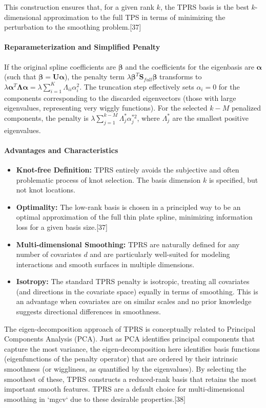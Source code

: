 \documentclass[11pt, a4paper]{article}
\begin{document}
This construction ensures that, for a given rank $k$, the TPRS basis is the best $k$-dimensional approximation to the full TPS in terms of minimizing the perturbation to the smoothing problem.[37]

\paragraph{Reparameterization and Simplified Penalty}
If the original spline coefficients are $\boldsymbol{\beta}$ and the coefficients for the eigenbasis are $\boldsymbol{\alpha}$ (such that $\boldsymbol{\beta} = \mathbf{U}\boldsymbol{\alpha}$), the penalty term $\lambda \boldsymbol{\beta}^T \mathbf{S}_{full} \boldsymbol{\beta}$ transforms to $\lambda \boldsymbol{\alpha}^T \mathbf{\Lambda} \boldsymbol{\alpha} = \lambda \sum_{i=1}^{K} \Lambda_{ii} \alpha_i^2$. The truncation step effectively sets $\alpha_i = 0$ for the components corresponding to the discarded eigenvectors (those with large eigenvalues, representing very wiggly functions). For the selected $k-M$ penalized components, the penalty is $\lambda \sum_{j=1}^{k-M} \Lambda_{j}^* \alpha_j^{*2}$, where $\Lambda_j^*$ are the smallest positive eigenvalues.

\paragraph{Advantages and Characteristics}
\begin{itemize}
 \item \textbf{Knot-free Definition:} TPRS entirely avoids the subjective and often problematic process of knot selection. The basis dimension $k$ is specified, but not knot locations.
 \item \textbf{Optimality:} The low-rank basis is chosen in a principled way to be an optimal approximation of the full thin plate spline, minimizing information loss for a given basis size.[37]
 \item \textbf{Multi-dimensional Smoothing:} TPRS are naturally defined for any number of covariates $d$ and are particularly well-suited for modeling interactions and smooth surfaces in multiple dimensions.
 \item \textbf{Isotropy:} The standard TPRS penalty is isotropic, treating all covariates (and directions in the covariate space) equally in terms of smoothing. This is an advantage when covariates are on similar scales and no prior knowledge suggests directional differences in smoothness.
\end{itemize}
The eigen-decomposition approach of TPRS is conceptually related to Principal Components Analysis (PCA). Just as PCA identifies principal components that capture the most variance, the eigen-decomposition here identifies basis functions (eigenfunctions of the penalty operator) that are ordered by their intrinsic smoothness (or wiggliness, as quantified by the eigenvalues). By selecting the smoothest of these, TPRS constructs a reduced-rank basis that retains the most important smooth features. TPRS are a default choice for multi-dimensional smoothing in `mgcv` due to these desirable properties.[38]
\end{document}
